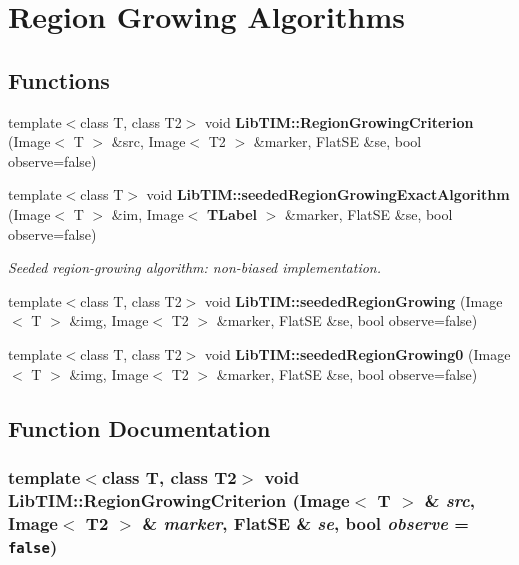 \section{Region Growing Algorithms}
\label{group__regionGrowing}
\subsection*{Functions}
\begin{CompactItemize}
\item 
template$<$class T, class T2$>$ void {\bf Lib\-TIM::Region\-Growing\-Criterion} (Image$<$ T $>$ \&src, Image$<$ T2 $>$ \&marker, Flat\-SE \&se, bool observe=false)
\item 
template$<$class T$>$ void {\bf Lib\-TIM::seeded\-Region\-Growing\-Exact\-Algorithm} (Image$<$ T $>$ \&im, Image$<$ {\bf TLabel} $>$ \&marker, Flat\-SE \&se, bool observe=false)
\begin{CompactList}\small\item\em Seeded region-growing algorithm: non-biased implementation. \item\end{CompactList}\item 
template$<$class T, class T2$>$ void {\bf Lib\-TIM::seeded\-Region\-Growing} (Image$<$ T $>$ \&img, Image$<$ T2 $>$ \&marker, Flat\-SE \&se, bool observe=false)
\item 
template$<$class T, class T2$>$ void {\bf Lib\-TIM::seeded\-Region\-Growing0} (Image$<$ T $>$ \&img, Image$<$ T2 $>$ \&marker, Flat\-SE \&se, bool observe=false)
\end{CompactItemize}


\subsection{Function Documentation}
\subsubsection{\setlength{\rightskip}{0pt plus 5cm}template$<$class T, class T2$>$ void Lib\-TIM::Region\-Growing\-Criterion (Image$<$ T $>$ \& {\em src}, Image$<$ T2 $>$ \& {\em marker}, Flat\-SE \& {\em se}, bool {\em observe} = {\tt false})}\label{group__regionGrowing_ga0}


